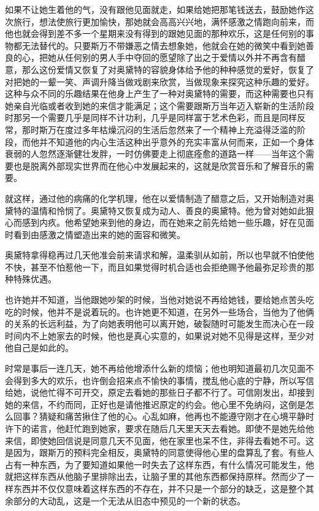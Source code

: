 \par 如果不让她生着他的气，没有跟他见面就走，如果给她把那笔钱送去，鼓励她作这次旅行，想法使旅行更加愉快，那她就会高高兴兴地，满怀感激之情跑向前来，而他也就会得到差不多一个星期来没有得到的跟她见面的那种欢乐，这是任何别的事物都无法替代的。只要斯万不带嫌恶之情去想象她，他就会在她的微笑中看到她善良的心，把她从任何别的男人手中夺回的愿望除了出之于爱情以外并不再含有醋意，那么这份爱情又恢复了对奥黛特的容貌身体给予他的种种感觉的爱好，恢复了对把她的一颦一笑、声调升降当做戏剧来欣赏，当做现象来探究这种乐趣的爱好。这种与众不同的乐趣结果在他身上产生了一种对奥黛特的需要，而这种需要也只有她亲自光临或者收到她的来信才能满足；这个需要跟斯万当年迈入崭新的生活阶段时那另一个需要几乎是同样不计功利，几乎是同样富于艺术色彩，而且是同样反常，那时斯万在度过多年枯燥沉闷的生活后忽然来了一个精神上充溢得泛滥的阶段，而他并不知道他的内心生活这种出乎意外的充实丰富从何而来，正如一个身体衰弱的人忽然逐渐健壮发胖，一时仿佛要走上彻底痊愈的道路一样——当年这个需要也是脱离外部现实世界而在他心中发展起来的，这就是欣赏音乐和了解音乐的需要。
\par 就这样，通过他的病痛的化学机理，他在以爱情制造了醋意之后，又开始制造对奥黛特的温情和怜悯了。奥黛特又恢复成为动人、善良的奥黛特。他为曾对她如此狠心而感到内疚。他希望她来到他的身边，而在她来之前先给她一些乐趣，好在见面时看到由感激之情塑造出来的她的面容和微笑。
\par 奥黛特拿得稳再过几天他准会前来请求和解，温柔驯从如前，所以也早就不怕使他不快，甚至不怕惹他一下，而且如果觉得时机合适也会拒绝赐予他最弥足珍贵的那种特殊优遇。
\par 也许她并不知道，当他跟她吵架的时候，当他对她说不再给她钱，要给她点苦头吃吃的时候，他并不是说着玩的。也许她更不知道，在另外一些场合，当他为了他俩的关系的长远利益，为了向她表明他可以离开她，破裂随时可能发生而决心在一段时间内不上她家去的时候，他也是真心实意的，如果说对她不见得是这样，至少对他自己是如此的。
\par 时常是事后一连几天，她不再给他增添什么新的烦恼；他也明知道最初几次见面不会得到多大的欢乐，也许倒会招来点不愉快的事情，搅乱他心底的宁静，所以写信给她，说他忙得不可开交，原定去看她的那些日子都不行了。可信刚发出，却接到她的来信，不约而同，正好也是请他推迟原定的约会。他心里不免纳闷，这倒是怎么回事？猜疑和痛苦揪住了他的心。心乱如麻，他再也不能遵守刚才在心境平静时许下的诺言，他赶忙跑到她家，要求在随后几天里天天去看她。即使不是她先给他来信，即使她回信说是同意几天不见面，他在家里也呆不住，非得去看她不可。这是因为，跟斯万的预料完全相反，奥黛特的同意使得他心里的盘算乱了套。有些人占有一种东西，为了要知道如果他一时失去了这样东西，有什么情况可能发生，他就把这样东西从他脑子里排除出去，让脑子里的其他东西都保持原样。然而少了一样东西并不仅仅意味着这样东西的不存在，并不只是一个部分的缺乏，这是整个其余部分的大动乱，这是一个无法从旧态中预见的一个新的状态。

